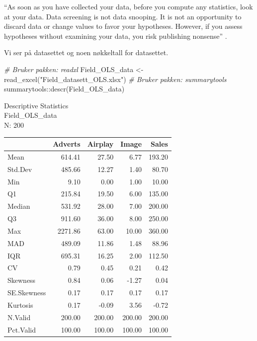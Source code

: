 \documentclass[
]{article}
\newenvironment{Shaded}{\begin{snugshade}}{\end{snugshade}}
\newcommand{\CommentTok}[1]{\textcolor[rgb]{0.56,0.35,0.01}{\textit{#1}}}
\newcommand{\FunctionTok}[1]{\textcolor[rgb]{0.00,0.00,0.00}{#1}}
\newcommand{\NormalTok}[1]{#1}
\newcommand{\OtherTok}[1]{\textcolor[rgb]{0.56,0.35,0.01}{#1}}
\newcommand{\SpecialCharTok}[1]{\textcolor[rgb]{0.00,0.00,0.00}{#1}}
\newcommand{\StringTok}[1]{\textcolor[rgb]{0.31,0.60,0.02}{#1}}
\begin{document}
``As soon as you have collected your data, before you compute any statistics, look at your data. Data screening is not data snooping. It is not an opportunity to discard data or change values to favor your hypotheses. However, if you assess hypotheses without examining your data, you risk publishing nonsense'' \citep{wilkinsonStatisticalMethodsPsychology1999}.

Vi ser på datasettet og noen nøkkeltall for datasettet.

\begin{Shaded}
\begin{Highlighting}[]
\CommentTok{\# Bruker pakken: readxl}
\NormalTok{Field\_OLS\_data }\OtherTok{\textless{}{-}} \FunctionTok{read\_excel}\NormalTok{(}\StringTok{"Field\_datasett\_OLS.xlsx"}\NormalTok{)}
\CommentTok{\# Bruker pakken: summarytools}
\NormalTok{summarytools}\SpecialCharTok{::}\FunctionTok{descr}\NormalTok{(Field\_OLS\_data)}
\end{Highlighting}
\end{Shaded}

Descriptive Statistics\\
Field\_OLS\_data\\
N: 200

\begin{longtable}[]{@{}lrrrr@{}}
\toprule
& Adverts & Airplay & Image & Sales \\
\midrule
\endhead
Mean & 614.41 & 27.50 & 6.77 & 193.20 \\
Std.Dev & 485.66 & 12.27 & 1.40 & 80.70 \\
Min & 9.10 & 0.00 & 1.00 & 10.00 \\
Q1 & 215.84 & 19.50 & 6.00 & 135.00 \\
Median & 531.92 & 28.00 & 7.00 & 200.00 \\
Q3 & 911.60 & 36.00 & 8.00 & 250.00 \\
Max & 2271.86 & 63.00 & 10.00 & 360.00 \\
MAD & 489.09 & 11.86 & 1.48 & 88.96 \\
IQR & 695.31 & 16.25 & 2.00 & 112.50 \\
CV & 0.79 & 0.45 & 0.21 & 0.42 \\
Skewness & 0.84 & 0.06 & -1.27 & 0.04 \\
SE.Skewness & 0.17 & 0.17 & 0.17 & 0.17 \\
Kurtosis & 0.17 & -0.09 & 3.56 & -0.72 \\
N.Valid & 200.00 & 200.00 & 200.00 & 200.00 \\
Pct.Valid & 100.00 & 100.00 & 100.00 & 100.00 \\
\bottomrule
\end{longtable}
\end{document}
